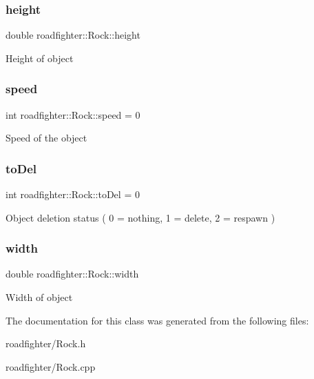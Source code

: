 \subsubsection{\texorpdfstring{height}{height}}
{\footnotesize\ttfamily double roadfighter\+::\+Rock\+::height\hspace{0.3cm}{\ttfamily [protected]}}

Height of object \mbox{\label{classroadfighter_1_1Rock_a6e25f8d74c9cba5a22da33bb24518063}} 
\subsubsection{\texorpdfstring{speed}{speed}}
{\footnotesize\ttfamily int roadfighter\+::\+Rock\+::speed = 0\hspace{0.3cm}{\ttfamily [protected]}}

Speed of the object \mbox{\label{classroadfighter_1_1Rock_a335c9ad9f6931075b34bfa15adf15fa6}} 
\subsubsection{\texorpdfstring{to\+Del}{toDel}}
{\footnotesize\ttfamily int roadfighter\+::\+Rock\+::to\+Del = 0\hspace{0.3cm}{\ttfamily [protected]}}

Object deletion status ( 0 = nothing, 1 = delete, 2 = respawn ) \mbox{\label{classroadfighter_1_1Rock_a68752ff27db401333fa3e0e1a504213d}} 
\subsubsection{\texorpdfstring{width}{width}}
{\footnotesize\ttfamily double roadfighter\+::\+Rock\+::width\hspace{0.3cm}{\ttfamily [protected]}}

Width of object 

The documentation for this class was generated from the following files\+:\begin{DoxyCompactItemize}
\item 
roadfighter/Rock.\+h\item 
roadfighter/Rock.\+cpp\end{DoxyCompactItemize}
